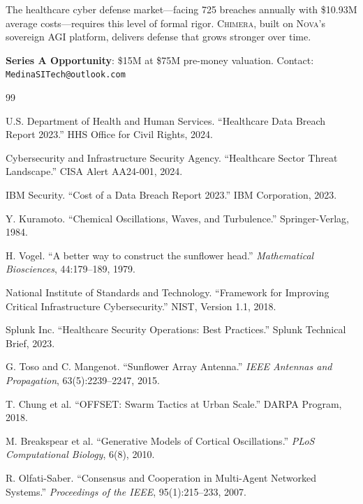\documentclass[12pt]{article}
\newcommand{\CHIMERA}{\textsc{Chimera}}
\newcommand{\NOVA}{\textsc{Nova}}
\begin{document}
The healthcare cyber defense market—facing 725 breaches annually with \$10.93M average costs—requires this level of formal rigor. \CHIMERA{}, built on \NOVA{}'s sovereign AGI platform, delivers defense that grows stronger over time.

\bigskip

\noindent\textbf{Series A Opportunity}: \$15M at \$75M pre-money valuation. Contact: \texttt{MedinaSITech@outlook.com}

\begin{thebibliography}{99}

U.S. Department of Health and Human Services. 
``Healthcare Data Breach Report 2023.'' 
HHS Office for Civil Rights, 2024.

Cybersecurity and Infrastructure Security Agency.
``Healthcare Sector Threat Landscape.''
CISA Alert AA24-001, 2024.

IBM Security.
``Cost of a Data Breach Report 2023.''
IBM Corporation, 2023.

Y. Kuramoto.
``Chemical Oscillations, Waves, and Turbulence.''
Springer-Verlag, 1984.

H. Vogel.
``A better way to construct the sunflower head.''
\emph{Mathematical Biosciences}, 44:179–189, 1979.

National Institute of Standards and Technology.
``Framework for Improving Critical Infrastructure Cybersecurity.''
NIST, Version 1.1, 2018.

Splunk Inc.
``Healthcare Security Operations: Best Practices.''
Splunk Technical Brief, 2023.

G. Toso and C. Mangenot.
``Sunflower Array Antenna.''
\emph{IEEE Antennas and Propagation}, 63(5):2239–2247, 2015.

T. Chung et al.
``OFFSET: Swarm Tactics at Urban Scale.''
DARPA Program, 2018.

M. Breakspear et al.
``Generative Models of Cortical Oscillations.''
\emph{PLoS Computational Biology}, 6(8), 2010.

R. Olfati-Saber.
``Consensus and Cooperation in Multi-Agent Networked Systems.''
\emph{Proceedings of the IEEE}, 95(1):215–233, 2007.

\end{thebibliography}
\end{document}
